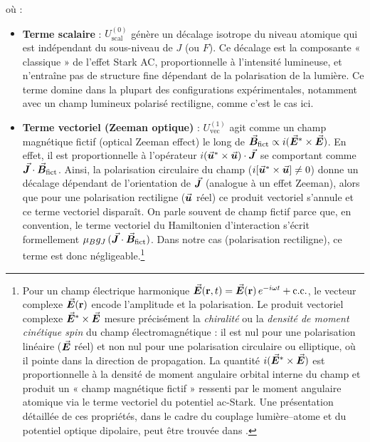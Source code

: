 où : 
\begin{itemize}[label = $\bullet$]
  \item \textbf{Terme scalaire} : $U_{\mathrm{scal}}^{(0)}$ génère un décalage isotrope du niveau atomique qui est indépendant du sous-niveau de $J$ (ou $F$). Ce décalage est la composante « classique » de l’effet Stark AC, proportionnelle à l’intensité lumineuse, et n’entraîne pas de structure fine dépendant de la polarisation de la lumière. Ce terme domine dans la plupart des configurations expérimentales, notamment avec un champ lumineux polarisé rectiligne, comme c’est le cas ici.

  \item \textbf{Terme vectoriel (Zeeman optique)} : $U_{\mathrm{vec}}^{(1)}$ agit comme un champ magnétique fictif (optical Zeeman effect) le long de $\vec{{\bm{B}}}_{\rm fict}\propto i(\vec{{\bm{E}}}^\ast\times \vec{{\bm{E}}})$. En effet, il est proportionnelle à l’opérateur $i(\vec{{\bm{u}}}^\ast\times\vec{{\bm{u}}})\cdot\vec{{\bm{J}}}$ se comportant comme $\vec{{\bm{J}}}\cdot \vec{{\bm{B}}}_{\rm fict}$. Ainsi, la polarisation circulaire du champ ($i[\vec{{\bm{u}}}^\ast\times\vec{{\bm{u}}}]\neq 0$) donne un décalage dépendant de l’orientation de $\vec{{\bm{J}}}$ (analogue à un effet Zeeman), alors que pour une polarisation rectiligne ($\vec{{\bm{u}}}$ réel) ce produit vectoriel s’annule et ce terme vectoriel disparaît. On parle souvent de champ fictif parce que, en convention, le terme vectoriel du Hamiltonien d’interaction s’écrit formellement $\mu_B g_J\,(\vec{{\bm{J}}}\cdot\vec{{\bm{B}}}_{\rm fict})$. Dans notre cas (polarisation rectiligne), ce terme est donc négligeable.\footnote{
Pour un champ électrique harmonique 
\(\vec{{\bm{E}}}(\mathbf{r},t)=\vec{{\bm{E}}}(\mathbf{r})\,e^{-i\omega t}+{\rm c.c.}\), 
le vecteur complexe \(\vec{{\bm{E}}}(\mathbf{r})\) encode l’amplitude et la polarisation.  
Le produit vectoriel complexe 
\(\vec{{\bm{E}}}^\ast\times\vec{{\bm{E}}}\) mesure précisément la \emph{chiralité} 
ou la \emph{densité de moment cinétique spin} du champ électromagnétique :  
il est nul pour une polarisation linéaire (\(\vec{{\bm{E}}}\) réel) et non nul pour une polarisation circulaire ou elliptique, où il pointe dans la direction de propagation.  
La quantité \(i(\vec{{\bm{E}}}^\ast\times\vec{{\bm{E}}})\) est proportionnelle à la densité de moment angulaire orbital interne du champ et produit un « champ magnétique fictif » ressenti par le moment angulaire atomique via le terme vectoriel du potentiel ac-Stark.  
Une présentation détaillée de ces propriétés, dans le cadre du couplage lumière–atome et du potentiel optique dipolaire, peut être trouvée dans \cite{Le_Kien_2013}.}



\end{itemize}
